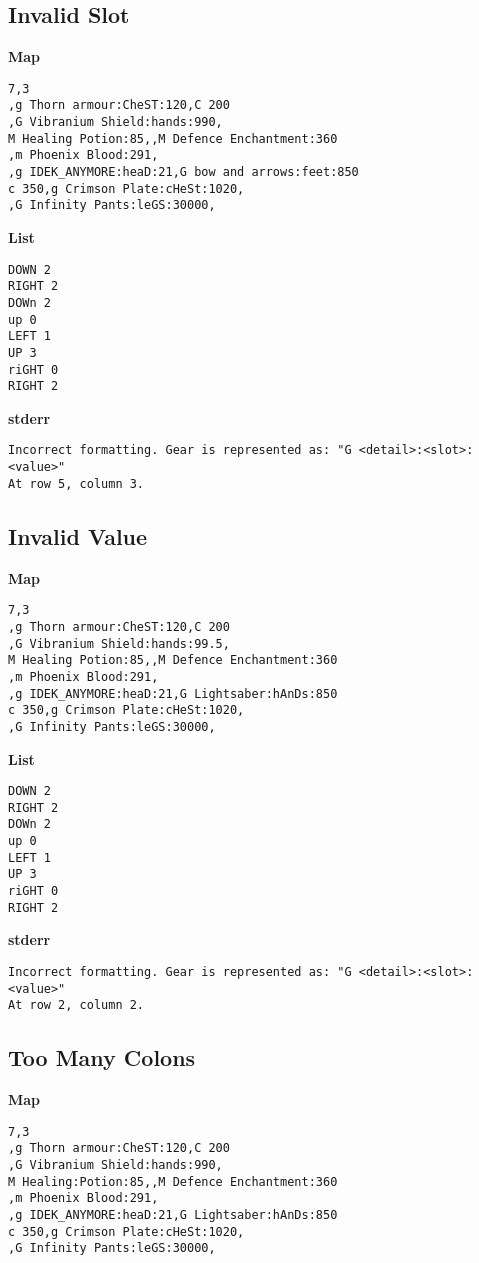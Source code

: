 \documentclass{article}
\begin{document}
\subsection{Invalid Slot}

\quad \textbf{Map}
\begin{lstlisting}
7,3
,g Thorn armour:CheST:120,C 200
,G Vibranium Shield:hands:990,
M Healing Potion:85,,M Defence Enchantment:360
,m Phoenix Blood:291,
,g IDEK_ANYMORE:heaD:21,G bow and arrows:feet:850
c 350,g Crimson Plate:cHeSt:1020,
,G Infinity Pants:leGS:30000,
\end{lstlisting}

\textbf{List}
\begin{lstlisting}
DOWN 2
RIGHT 2
DOWn 2
up 0
LEFT 1
UP 3
riGHT 0
RIGHT 2
\end{lstlisting}
\pagebreak

\textbf{stderr}
\begin{lstlisting}
Incorrect formatting. Gear is represented as: "G <detail>:<slot>:<value>"
At row 5, column 3.
\end{lstlisting}

\subsection{Invalid Value}

\quad \textbf{Map}
\begin{lstlisting}
7,3
,g Thorn armour:CheST:120,C 200
,G Vibranium Shield:hands:99.5,
M Healing Potion:85,,M Defence Enchantment:360
,m Phoenix Blood:291,
,g IDEK_ANYMORE:heaD:21,G Lightsaber:hAnDs:850
c 350,g Crimson Plate:cHeSt:1020,
,G Infinity Pants:leGS:30000,
\end{lstlisting}

\textbf{List}
\begin{lstlisting}
DOWN 2
RIGHT 2
DOWn 2
up 0
LEFT 1
UP 3
riGHT 0
RIGHT 2
\end{lstlisting}
\pagebreak

\textbf{stderr}
\begin{lstlisting}
Incorrect formatting. Gear is represented as: "G <detail>:<slot>:<value>"
At row 2, column 2.
\end{lstlisting}

\subsection{Too Many Colons}

\quad \textbf{Map}
\begin{lstlisting}
7,3
,g Thorn armour:CheST:120,C 200
,G Vibranium Shield:hands:990,
M Healing:Potion:85,,M Defence Enchantment:360
,m Phoenix Blood:291,
,g IDEK_ANYMORE:heaD:21,G Lightsaber:hAnDs:850
c 350,g Crimson Plate:cHeSt:1020,
,G Infinity Pants:leGS:30000,
\end{lstlisting}
\end{document}
